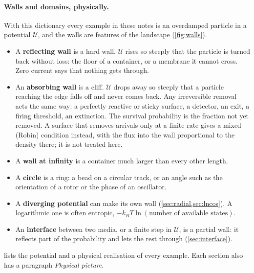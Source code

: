 \documentclass[11pt]{article}
\numberwithin{equation}{section}
\begin{document}
\paragraph{Walls and domains, physically.} With this dictionary every example in these notes is an overdamped
particle in a potential $\mathcal U$, and the walls are features of the landscape (\cref{fig:walls}).
\begin{itemize}
  \item A \textbf{reflecting wall} is a hard wall. $\mathcal U$ rises so steeply that the particle is turned back
        without loss: the floor of a container, or a membrane it cannot cross. Zero current says that nothing gets
        through.
  \item An \textbf{absorbing wall} is a cliff. $\mathcal U$ drops away so steeply that a particle reaching the edge
        falls off and never comes back. Any irreversible removal acts the same way: a perfectly reactive or sticky
        surface, a detector, an exit, a firing threshold, an extinction. The survival probability is the fraction
        not yet removed. A surface that removes arrivals only at a finite rate gives a mixed (Robin) condition
        instead, with the flux into the wall proportional to the density there; it is not treated here.
  \item A \textbf{wall at infinity} is a container much larger than every other length.
  \item A \textbf{circle} is a ring: a bead on a circular track, or an angle such as the orientation of a rotor or
        the phase of an oscillator.
  \item A \textbf{diverging potential} can make its own wall (\cref{sec:radial,sec:lncos}). A logarithmic one is
        often entropic, $-k_BT\ln(\text{number of available states})$.
  \item An \textbf{interface} between two media, or a finite step in $\mathcal U$, is a partial wall: it reflects
        part of the probability and lets the rest through (\cref{sec:interface}).
\end{itemize}
 lists the potential and a physical realisation of every example. Each section also has a
paragraph \emph{Physical picture}.
\end{document}
